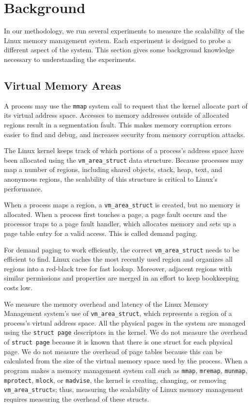 \documentclass[twocolumn,11pt]{article}
\begin{document}
\section{Background}

In our methodology, we run several experiments to measure the scalability of
the Linux memory management system. Each experiment is designed to probe a
different aspect of the system. This section gives some background knowledge
necessary to understanding the experiments.

\subsection{Virtual Memory Areas}

A process may use the \texttt{mmap} system call to request that the kernel
allocate part of its virtual address space. Accesses to memory addresses
outside of allocated regions result in a segmentation fault. This makes memory
corruption errors easier to find and debug, and increases security from memory
corruption attacks.

The Linux kernel keeps track of which portions of a process's address space
have been allocated using the \texttt{vm\_area\_struct} data structure. Because
processes may map a number of regions, including shared objects, stack, heap,
text, and anonymous regions, the scalability of this structure is critical to
Linux's performance.

When a process maps a region, a \texttt{vm\_area\_struct} is created, but no
memory is allocated. When a process first touches a page, a page fault occurs
and the processor traps to a page fault handler, which allocates memory and
sets up a page table entry for a valid access. This is called demand paging.

For demand paging to work efficiently, the correct \texttt{vm\_area\_struct}
needs to be efficient to find. Linux caches the most recently used region and
organizes all regions into a red-black tree for fast lookup.  Moreover,
adjacent regions with similar permissions and properties are merged in an
effort to keep bookkeeping costs low.

We measure the memory overhead and latency of the Linux Memory Management
system's use of \texttt{vm\_area\_struct}, which represents a region of a
process's virtual address space. All the physical pages in the system are
managed using the \texttt{struct page} descriptors in the kernel.  We do not
measure the overhead of \texttt{struct page} because it is known that there is
one struct for each physical page. We do not measure the overhead of page
tables because this can be calculated from the size of the virtual memory space
used by the process.  When a program makes a memory management system call
such as \texttt{mmap}, \texttt{mremap}, \texttt{munmap}, \texttt{mprotect},
\texttt{mlock}, or \texttt{madvise}, the kernel is creating, changing, or
removing \texttt{vm\_area\_struct}s; thus, measuring the scalability of Linux
memory management requires measuring the overhead of these structs.
\end{document}
